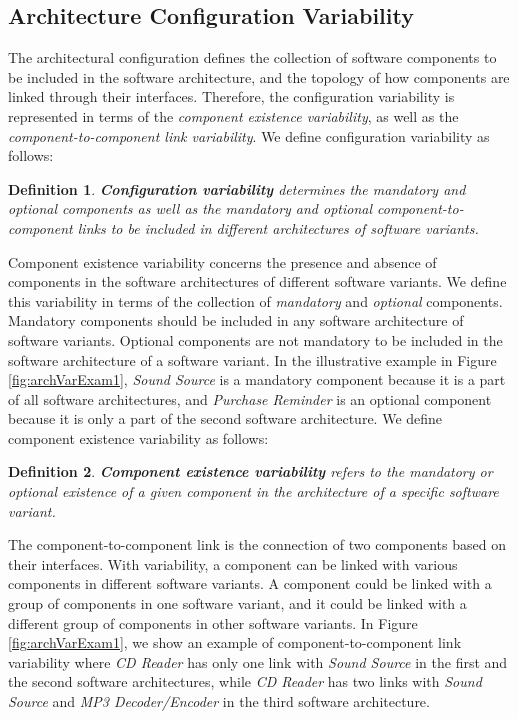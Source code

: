 \documentclass[graybox]{svmult}
\newtheorem{mydef}{Definition}
\begin{document}
\subsection{ {Architecture} Configuration Variability} 
The architectural configuration defines the collection of software components to be included in the software architecture, and the topology of how components are linked through their interfaces. Therefore, the configuration variability is represented in terms of the \textit{component existence variability}, as well as the \textit{component-to-component link variability}. We define configuration variability as follows:

\begin{mydef}
\textbf{Configuration variability} determines the mandatory and optional components as well as the  mandatory and optional component-to-component links to be included in different architectures of software variants.
\end{mydef}


Component existence variability concerns the presence and absence of components in the software architectures of different software variants. We define this variability in terms of the collection of \textit{mandatory} and \textit{optional} components. Mandatory components should be included in any software architecture of software variants. Optional components are not mandatory to be included in the software architecture of a software variant. In the illustrative example in Figure \ref{fig:archVarExam1}, \textit{Sound Source} is a mandatory component because it is a part of all software architectures, and \textit{Purchase Reminder} is an optional component because it is only a part of the second software architecture. We define component existence variability as follows:


\begin{mydef}
\textbf{Component existence variability}  {refers to the mandatory or optional existence of a given component in the architecture of a specific software variant.}
\end{mydef}


The component-to-component link is the connection of two components based on their interfaces. With variability, a component can be linked with various components in different software variants. A component could be linked with a group of components in one software variant, and it could be linked with a different group of components in other software variants. In Figure \ref{fig:archVarExam1}, we show an example of component-to-component link variability where \textit{CD Reader} has only one link with \textit{Sound Source} in the first and the second software architectures, while \textit{CD Reader} has two links with \textit{Sound Source} and \textit{MP3 Decoder/Encoder} in the third software architecture.
\end{document}
